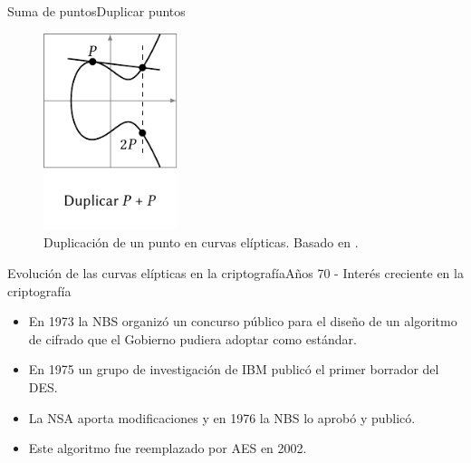 \documentclass[spanish]{beamer}
\begin{document}
\begin{frame}{Suma de puntos}{Duplicar puntos}
  \begin{figure}[h]
    \centering
    \includegraphics[width=0.35\textwidth]{img/duplicar-curvas}
    \caption{Duplicación de un punto en curvas elípticas. Basado en  \parencite{eichlseder_elliptic_2016}.}
    \label{fig:duplicar-curvas}
  \end{figure}
\end{frame}

\begin{frame}[fragile]{Evolución de las curvas elípticas en la criptografía}{Años 70 - Interés creciente en la criptografía}
  \begin{itemize}
    \item En 1973 la NBS organizó un concurso público para el diseño de un algoritmo de cifrado que el Gobierno pudiera adoptar como estándar.
    \item En 1975 un grupo de investigación de IBM publicó el primer borrador del DES.
    \item La NSA aporta modificaciones y en 1976 la NBS lo aprobó y publicó. %
    \item Este algoritmo fue reemplazado por AES en 2002.
  \end{itemize}
\end{frame}
\end{document}
